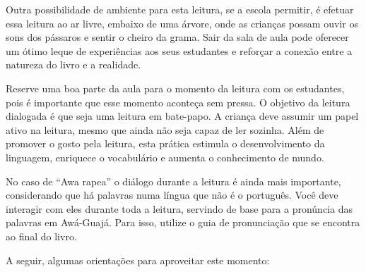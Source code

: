 \documentclass[11pt]{extarticle}
\begin{document}
Outra possibilidade de ambiente para esta leitura, se a escola permitir, 
é efetuar essa leitura ao ar livre, embaixo de uma árvore, onde as crianças 
possam ouvir os sons dos pássaros e sentir o cheiro da grama. Sair da sala 
de aula pode oferecer um ótimo leque de experiências aos seus estudantes e 
reforçar a conexão entre a natureza do livro e a realidade.  

Reserve uma boa parte da aula para o momento da leitura com os estudantes, 
pois é importante que esse momento aconteça sem pressa. O objetivo da 
leitura dialogada é que seja uma leitura em bate-papo. A criança deve 
assumir um papel ativo na leitura, mesmo que ainda não seja capaz de 
ler sozinha. Além de promover o gosto pela leitura, esta prática estimula 
o desenvolvimento da linguagem, enriquece o vocabulário e 
aumenta o conhecimento de mundo.

No caso de ``Awa rapea'' o diálogo durante a leitura é 
ainda mais importante, considerando que há palavras numa língua que não é o português. 
Você deve interagir com eles durante toda a 
leitura, servindo de base para a pronúncia das palavras em Awá-Guajá.
Para isso, utilize o guia de pronunciação que se encontra ao final do livro.

A seguir, algumas orientações para aproveitar este momento: 
\end{document}
